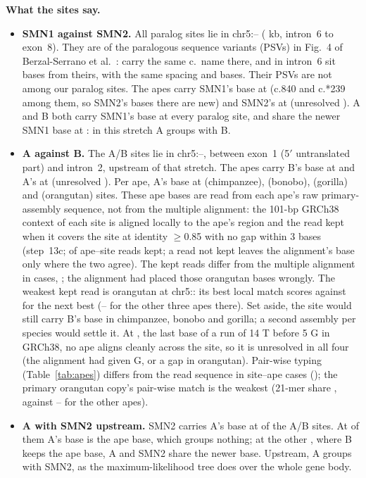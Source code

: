 \textbf{What the sites say.}
\begin{itemize}
\item \textbf{SMN1 against SMN2.} All \evS{} paralog sites lie in chr5:\evSfrom--\evSto{} (\evSspanKb{} kb, intron~6 to
exon~8). They are \bzMatch{} of the \bzPsvN{} paralogous sequence variants (PSVs) in Fig.~4 of Berzal-Serrano et al.~\cite{berzal2026}: \bzExact{} carry the same c.\ name there, and \bzOff{} in intron~6 sit \bzOffBp{} bases from theirs, with the same spacing and bases. Their PSVs \bzUnmatched{} are not among our paralog sites. The apes carry SMN1's base at \evSancOne{} (c.840 and c.*239 among them, so SMN2's bases there are new) and
SMN2's at \evSancTwo{} (unresolved \evSunres). A and B both carry SMN1's base at every paralog site, and share the newer
SMN1 base at \evSsharedAB: in this stretch A groups with B.
\item \textbf{A against B.} The \evAB{} A/B sites lie in chr5:\evABfrom--\evABto, between exon~1 (5$'$ untranslated part) and intron~2, upstream of that
stretch. The apes carry B's base at \evABancB{} and A's at \evABancA{} (unresolved \evABunres). Per ape, A's base at
\evABAChimp{} (chimpanzee), \evABABonobo{} (bonobo), \evABAGorilla{} (gorilla) and \evABAOrang{} (orangutan) sites. These ape bases are read from each ape's raw primary-assembly sequence, not from the multiple alignment: the 101-bp GRCh38 context of each site is aligned locally to the ape's region and the read kept when it covers the site at identity $\geq$0.85 with no gap within 3 bases (step~13c; \rdAcc{} of \rdN{} ape--site reads kept; a read not kept leaves the alignment's base only where the two agree). The kept reads differ from the multiple alignment in \rdMsaDiffN{} cases, \rdMsaDiff; the alignment had placed those orangutan bases wrongly. The weakest kept read is orangutan at chr5:\rdWeakSite: its best local match scores \rdWeakScore{} against \rdWeakSecond{} for the next best (\rdWeakOthLo--\rdWeakOthHi{} for the other three apes there). Set aside, the site would still carry B's base in chimpanzee, bonobo and gorilla; a second assembly per species would settle it. At \rdUnresSite, the last base of a run of 14 T before 5 G in GRCh38, no ape aligns cleanly across the site, so it is unresolved in all four (the alignment had given G, or a gap in orangutan). Pair-wise typing (Table~\ref{tab:apes}) differs from the read sequence in \apeDiffN{} site--ape cases (\apeDiffSites); the primary orangutan copy's pair-wise match is the weakest (21-mer share \apeOrangKmer, against \apeOtherKmerLo--\apeOtherKmerHi{} for the other apes).
\item \textbf{A with SMN2 upstream.} SMN2 carries A's base at \evABtwoEqA{} of the \evAB{} A/B sites. At \evABtwoEqAanc{}
of them A's base is the ape base, which groups nothing; at the other \evABsharedATwo, where B keeps the ape base, A and
SMN2 share the newer base. Upstream, A groups with SMN2, as the maximum-likelihood tree does over the whole gene body.
\end{itemize}

